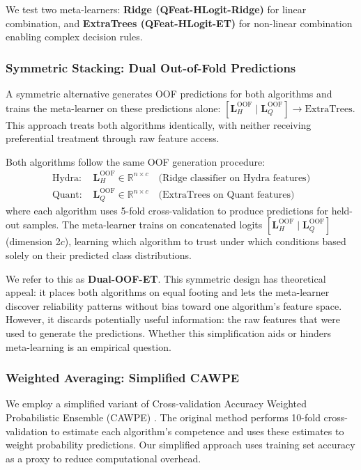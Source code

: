 \documentclass[pdflatex,sn-basic]{sn-jnl}           %
\theoremstyle{thmstyleone}%
\theoremstyle{thmstyletwo}%
\theoremstyle{thmstylethree}%
\begin{document}
We test two meta-learners: \textbf{Ridge (QFeat-HLogit-Ridge)} for linear combination, and \textbf{ExtraTrees (QFeat-HLogit-ET)} for non-linear combination enabling complex decision rules.

\subsubsection{Symmetric Stacking: Dual Out-of-Fold Predictions}

A symmetric alternative generates OOF predictions for both algorithms and trains the meta-learner on these predictions alone: $[\mathbf{L}_H^{\text{OOF}} \mid \mathbf{L}_Q^{\text{OOF}}] \rightarrow \text{ExtraTrees}$. This approach treats both algorithms identically, with neither receiving preferential treatment through raw feature access.

Both algorithms follow the same OOF generation procedure:
\begin{equation}
\begin{aligned}
\text{Hydra: } & \mathbf{L}_H^{\text{OOF}} \in \mathbb{R}^{n \times c} \quad \text{(Ridge classifier on Hydra features)} \\
\text{Quant: } & \mathbf{L}_Q^{\text{OOF}} \in \mathbb{R}^{n \times c} \quad \text{(ExtraTrees on Quant features)}
\end{aligned}
\end{equation}
where each algorithm uses 5-fold cross-validation to produce predictions for held-out samples. The meta-learner trains on concatenated logits $[\mathbf{L}_H^{\text{OOF}} \mid \mathbf{L}_Q^{\text{OOF}}]$ (dimension 2$c$), learning which algorithm to trust under which conditions based solely on their predicted class distributions.

We refer to this as \textbf{Dual-OOF-ET}. This symmetric design has theoretical appeal: it places both algorithms on equal footing and lets the meta-learner discover reliability patterns without bias toward one algorithm's feature space. However, it discards potentially useful information: the raw features that were used to generate the predictions. Whether this simplification aids or hinders meta-learning is an empirical question.

\subsubsection{Weighted Averaging: Simplified CAWPE}

We employ a simplified variant of Cross-validation Accuracy Weighted Probabilistic Ensemble (CAWPE) \citep{cawpe}. The original method performs 10-fold cross-validation to estimate each algorithm's competence and uses these estimates to weight probability predictions. Our simplified approach uses training set accuracy as a proxy to reduce computational overhead.
\end{document}
